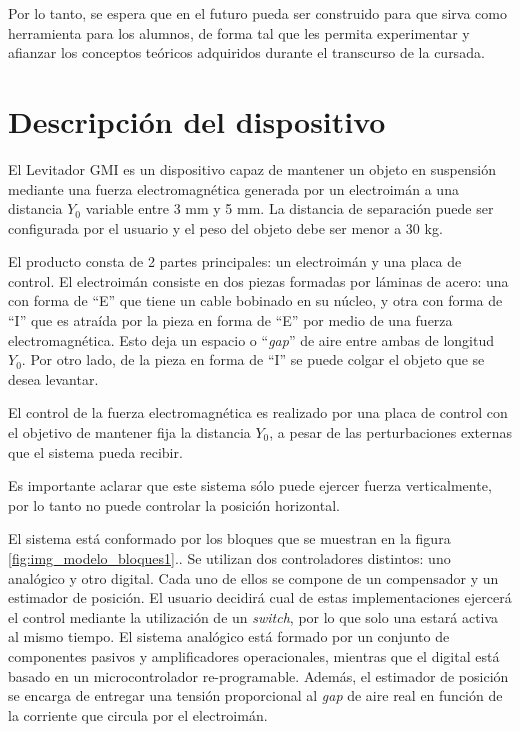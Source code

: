 \noindent Por lo tanto, se espera que en el futuro pueda ser construido para que sirva como herramienta para los alumnos, de forma tal que les permita experimentar y afianzar los conceptos teóricos adquiridos durante el transcurso de la cursada.



\section{Descripción del dispositivo}

\noindent El Levitador GMI es un dispositivo capaz de mantener un objeto en suspensi\'{o}n  mediante una fuerza electromagn\'{e}tica generada por un electroim\'{a}n a una distancia $Y_0$ variable entre 3 mm y 5 mm. La distancia de separaci\'{o}n puede ser configurada por el usuario y el peso del objeto debe ser menor a 30 kg. 

\noindent El producto consta de 2 partes principales: un electroim\'{a}n y una placa de control. El electroim\'{a}n consiste en dos piezas formadas por l\'{a}minas de acero: una con forma de ``E'' que tiene un cable bobinado en su n\'{u}cleo, y otra con forma de ``I'' que es atra\'{i}da por la pieza en forma de ``E'' por medio de una fuerza electromagn\'{e}tica. Esto deja un espacio o ``\textit{gap}'' de aire entre ambas de longitud $Y_0$. Por otro lado, de la pieza en forma de ``I'' se puede colgar el objeto que se desea levantar.

\noindent El control de la fuerza electromagn\'{e}tica es realizado por una placa de control con el objetivo de mantener fija la distancia $Y_0$, a pesar de las perturbaciones externas que el sistema pueda recibir. 

\noindent Es importante aclarar que este sistema s\'{o}lo puede ejercer fuerza verticalmente, por lo tanto no puede controlar la posici\'{o}n horizontal.


\noindent El sistema est\'{a} conformado por los bloques que se muestran en la figura \ref{fig:img_modelo_bloques1}.. Se utilizan dos controladores distintos: uno anal\'{o}gico y otro digital. Cada uno de ellos se compone de un compensador y un estimador de posici\'{o}n.  El usuario decidir\'{a} cual de estas implementaciones ejercer\'{a} el control mediante la utilizaci\'{o}n de un \textit{switch}, por lo que solo una estar\'{a} activa al mismo tiempo. El sistema anal\'{o}gico est\'{a} formado por un conjunto de componentes pasivos y amplificadores operacionales, mientras que el digital est\'{a} basado en un microcontrolador re-programable. Adem\'{a}s, el estimador de posici\'{o}n se encarga de  entregar una tensi\'{o}n proporcional al \textit{gap }de aire real en funci\'{o}n de  la corriente que circula por el electroim\'{a}n.


